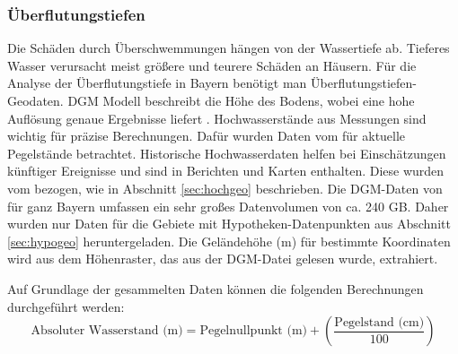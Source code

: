 \subsubsection{Überflutungstiefen}\label{sec:tief}
Die Schäden durch Überschwemmungen hängen von der Wassertiefe ab. Tieferes Wasser verursacht meist größere und teurere Schäden an Häusern. Für die Analyse der Überflutungstiefe in Bayern benötigt man Überflutungstiefen-Geodaten. \ac{DGM} Modell beschreibt die Höhe des Bodens, wobei eine hohe Auflösung genaue Ergebnisse liefert \parencite{vermessungsverwaltung2019gelandemodell}. Hochwasserstände aus Messungen sind wichtig für präzise Berechnungen. Dafür wurden Daten vom \textcite{bayern2016hochwassernachrichtendienst} für aktuelle Pegelstände betrachtet. Historische Hochwasserdaten helfen bei Einschätzungen künftiger Ereignisse und sind in Berichten und Karten enthalten. Diese wurden vom \textcite{LfU_Bayern} bezogen, wie in Abschnitt \ref{sec:hochgeo} beschrieben.
Die \ac{DGM}-Daten von \textcite{vermessungsverwaltung2019gelandemodell} für ganz Bayern umfassen ein sehr großes Datenvolumen von ca. 240 GB. Daher wurden nur Daten für die Gebiete mit Hypotheken-Datenpunkten aus Abschnitt \ref{sec:hypogeo} heruntergeladen.
Die Geländehöhe (m) für bestimmte Koordinaten wird aus dem Höhenraster, das aus der \ac{DGM}-Datei gelesen wurde, extrahiert.

Auf Grundlage der gesammelten Daten können die folgenden Berechnungen durchgeführt werden:
\begin{equation}
    \text{Absoluter Wasserstand (m)} = \text{Pegelnullpunkt (m)} + \left(\frac{\text{Pegelstand (cm)}}{100}\right)
\end{equation}

